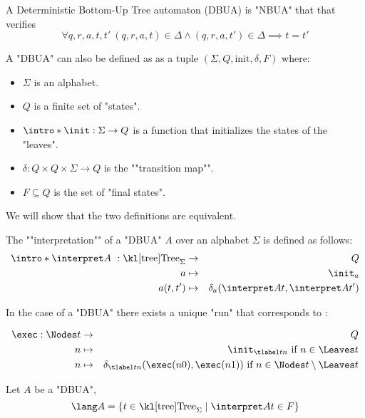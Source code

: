 \documentclass{article}
\begin{document}
\begin{definition}
	A Deterministic Bottom-Up Tree automaton (DBUA) is "NBUA" that that verifies
	\[ \forall q,r,a,t,t' \ (q,r,a,t) \in \Delta \land   (q,r,a,t') \in \Delta  \implies t = t' \]
\end{definition}

\begin{remark}
	A "DBUA" can also be defined as as a tuple $(\Sigma, Q, \text{init}, \delta, F)$ where:
	\begin{itemize}
		\item $\Sigma$ is an alphabet.
		\item $Q$ is a finite set of "states".
		\item $\intro *\init : \Sigma \to Q$ is a function that initializes the states of the "leaves".
		\item $\delta : Q \times Q \times \Sigma \to Q$ is the ""transition map"".
		\item $F \subseteq Q$ is the set of "final states".
	\end{itemize}
	We will show that the two definitions are equivalent.
\end{remark}

\begin{definition}
	The ""interpretation"" of a "DBUA" $A$  over an alphabet $\Sigma$ is defined as follows:
	\begin{eqnarray*}
		\intro* \interpret A ~: \tree_{\Sigma} &\to& Q \\
		a &\mapsto& \init_a \\
		a(t,t') &\mapsto& \delta_a (\interpret A t, \interpret A {t'})
	\end{eqnarray*}
\end{definition}

\begin{remark}
	In the case of a "DBUA" there exists a unique "run" that corresponds to :

	\begin{eqnarray*}
		\exec : \Nodes t &\to & Q \\
		n  &\mapsto& \init_{\tlabel t n} \text{ if } n \in \Leaves t \\
		n  &\mapsto& \delta_{\tlabel t n}(\exec (n0), \exec (n1)) \text{ if } n \in \Nodes t \setminus \Leaves t
	\end{eqnarray*}
\end{remark}

\begin{lemma}
	Let $A$ be a "DBUA",
	\[ \lang A = \setdef {t \in \tree_{\Sigma}} {\interpret A t \in F} \]
\end{lemma}
\end{document}
